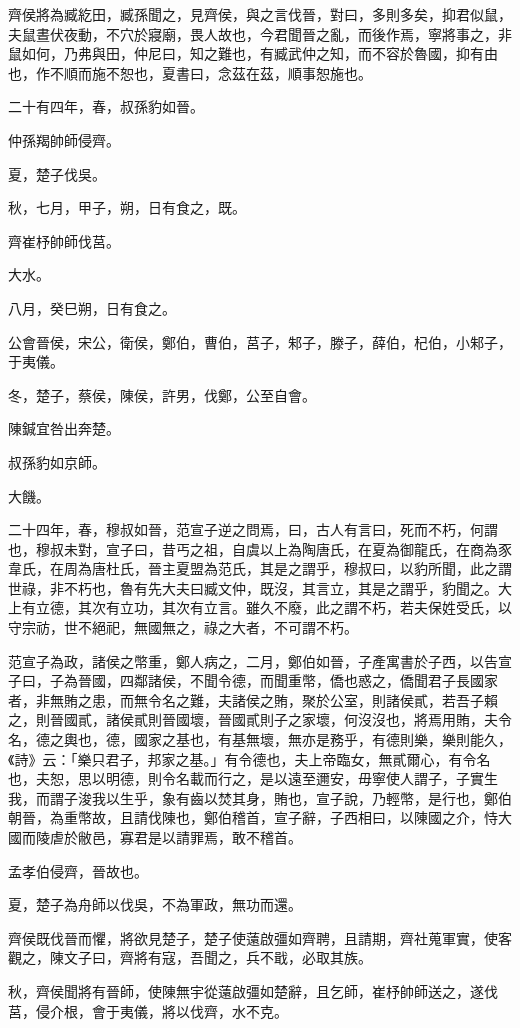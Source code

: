 \begin{pinyinscope}
齊侯將為臧紇田，臧孫聞之，見齊侯，與之言伐晉，對曰，多則多矣，抑君似鼠，夫鼠晝伏夜動，不穴於寢廟，畏人故也，今君聞晉之亂，而後作焉，寧將事之，非鼠如何，乃弗與田，仲尼曰，知之難也，有臧武仲之知，而不容於魯國，抑有由也，作不順而施不恕也，夏書曰，念茲在茲，順事恕施也。

二十有四年，春，叔孫豹如晉。

仲孫羯帥師侵齊。

夏，楚子伐吳。

秋，七月，甲子，朔，日有食之，既。

齊崔杼帥師伐莒。

大水。

八月，癸巳朔，日有食之。

公會晉侯，宋公，衛侯，鄭伯，曹伯，莒子，邾子，滕子，薛伯，杞伯，小邾子，于夷儀。

冬，楚子，蔡侯，陳侯，許男，伐鄭，公至自會。

陳鍼宜咎出奔楚。

叔孫豹如京師。

大饑。

二十四年，春，穆叔如晉，范宣子逆之問焉，曰，古人有言曰，死而不朽，何謂也，穆叔未對，宣子曰，昔丐之祖，自虞以上為陶唐氏，在夏為御龍氏，在商為豕韋氏，在周為唐杜氏，晉主夏盟為范氏，其是之謂乎，穆叔曰，以豹所聞，此之謂世祿，非不朽也，魯有先大夫曰臧文仲，既沒，其言立，其是之謂乎，豹聞之。大上有立德，其次有立功，其次有立言。雖久不廢，此之謂不朽，若夫保姓受氏，以守宗祊，世不絕祀，無國無之，祿之大者，不可謂不朽。

范宣子為政，諸侯之幣重，鄭人病之，二月，鄭伯如晉，子產寓書於子西，以告宣子曰，子為晉國，四鄰諸侯，不聞令德，而聞重幣，僑也惑之，僑聞君子長國家者，非無賄之患，而無令名之難，夫諸侯之賄，聚於公室，則諸侯貳，若吾子賴之，則晉國貳，諸侯貳則晉國壞，晉國貳則子之家壞，何沒沒也，將焉用賄，夫令名，德之輿也，德，國家之基也，有基無壞，無亦是務乎，有德則樂，樂則能久，《詩》云：「樂只君子，邦家之基。」有令德也，夫上帝臨女，無貳爾心，有令名也，夫恕，思以明德，則令名載而行之，是以遠至邇安，毋寧使人謂子，子實生我，而謂子浚我以生乎，象有齒以焚其身，賄也，宣子說，乃輕幣，是行也，鄭伯朝晉，為重幣故，且請伐陳也，鄭伯稽首，宣子辭，子西相曰，以陳國之介，恃大國而陵虐於敝邑，寡君是以請罪焉，敢不稽首。

孟孝伯侵齊，晉故也。

夏，楚子為舟師以伐吳，不為軍政，無功而還。

齊侯既伐晉而懼，將欲見楚子，楚子使薳啟彊如齊聘，且請期，齊社蒐軍實，使客觀之，陳文子曰，齊將有寇，吾聞之，兵不戢，必取其族。

秋，齊侯聞將有晉師，使陳無宇從薳啟彊如楚辭，且乞師，崔杼帥師送之，遂伐莒，侵介根，會于夷儀，將以伐齊，水不克。


\end{pinyinscope}
